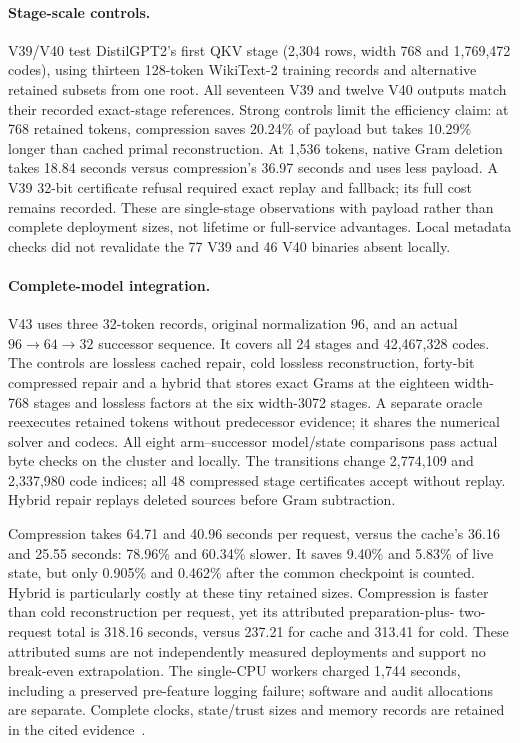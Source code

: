 \documentclass[10pt,twocolumn,letterpaper]{article}
\begin{document}
\paragraph{Stage-scale controls.}
V39/V40 test DistilGPT2's first QKV stage (2,304 rows, width 768 and 1,769,472
codes), using thirteen 128-token WikiText-2 training records and alternative
retained subsets from one root. All seventeen V39 and twelve V40 outputs match
their recorded exact-stage references. Strong controls limit the efficiency
claim: at 768 retained tokens, compression saves 20.24\% of payload but takes
10.29\% longer than cached primal reconstruction. At 1,536 tokens, native Gram
deletion takes 18.84 seconds versus compression's 36.97 seconds and uses less
payload. A V39 32-bit certificate refusal required exact replay and fallback;
its full cost remains recorded. These are single-stage observations with payload
rather than complete deployment sizes, not lifetime or full-service advantages.
Local metadata checks did not revalidate the 77 V39 and 46 V40 binaries absent
locally.

\paragraph{Complete-model integration.}
\label{sec:v43}
V43 uses three 32-token records, original normalization 96, and an actual
$96\to64\to32$ successor sequence. It covers all 24 stages and 42,467,328 codes.
The controls are lossless cached repair, cold lossless reconstruction, forty-bit
compressed repair and a hybrid that stores exact Grams at the eighteen width-768
stages and lossless factors at the six width-3072 stages. A separate oracle
reexecutes retained tokens without predecessor evidence; it shares the numerical
solver and codecs. All eight arm--successor model/state comparisons pass actual
byte checks on the cluster and locally. The transitions change 2,774,109 and
2,337,980 code indices; all 48 compressed stage certificates accept without
replay. Hybrid repair replays deleted sources before Gram subtraction.

Compression takes 64.71 and 40.96 seconds per request, versus the cache's 36.16
and 25.55 seconds: 78.96\% and 60.34\% slower. It saves 9.40\% and 5.83\% of
live state, but only 0.905\% and 0.462\% after the common checkpoint is counted.
Hybrid is particularly costly at these tiny retained sizes. Compression is
faster than cold reconstruction per request, yet its attributed preparation-plus-
two-request total is 318.16 seconds, versus 237.21 for cache and 313.41 for cold.
These attributed sums are not independently measured deployments and support no
break-even extrapolation. The single-CPU workers charged 1,744 seconds, including
a preserved pre-feature logging failure; software and audit allocations are
separate. Complete clocks, state/trust sizes and memory records are retained
in the cited evidence~\cite{v43}.
\end{document}
